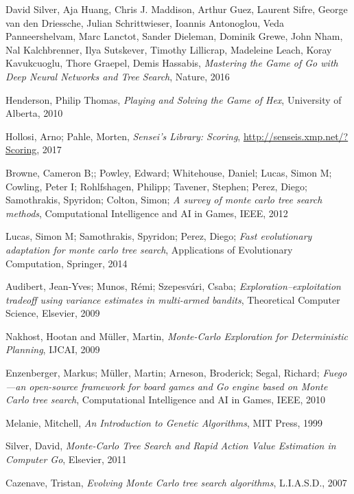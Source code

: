 \documentclass[12pt]{report}
\begin{document}
\begin{thebibliography}{99}
 David Silver, Aja Huang, Chris J. Maddison, Arthur Guez, Laurent Sifre, George van den Driessche, Julian Schrittwieser, Ioannis Antonoglou, Veda Panneershelvam, Marc Lanctot, Sander Dieleman, Dominik Grewe, John Nham, Nal Kalchbrenner, Ilya Sutskever, Timothy Lillicrap, Madeleine Leach, Koray Kavukcuoglu, Thore Graepel, Demis Hassabis, \emph{Mastering the Game of Go with Deep Neural Networks and Tree Search}, Nature, 2016

 Henderson, Philip Thomas, \emph{Playing and Solving the Game of Hex}, University of Alberta, 2010

 Hollosi, Arno; Pahle, Morten, \emph{Sensei's Library: Scoring}, \url{http://senseis.xmp.net/?Scoring}, 2017

 Browne, Cameron B;; Powley, Edward; Whitehouse, Daniel; Lucas, Simon M; Cowling, Peter I; Rohlfshagen, Philipp; Tavener, Stephen; Perez, Diego; Samothrakis, Spyridon; Colton, Simon; \emph{A survey of monte carlo tree search methods}, Computational Intelligence and AI in Games, IEEE, 2012

 Lucas, Simon M; Samothrakis, Spyridon; Perez, Diego; \emph{Fast evolutionary adaptation for monte carlo tree search}, Applications of Evolutionary Computation, Springer, 2014

 Audibert, Jean-Yves; Munos, R{\'e}mi; Szepesv{\'a}ri, Csaba; \emph{Exploration--exploitation tradeoff using variance estimates in multi-armed bandits}, Theoretical Computer Science, Elsevier, 2009

 Nakhost, Hootan and M{\"u}ller, Martin, \emph{Monte-Carlo Exploration for Deterministic Planning}, IJCAI, 2009

 Enzenberger, Markus; M{\"u}ller, Martin; Arneson, Broderick; Segal, Richard; \emph{Fuego—an open-source framework for board games and Go engine based on Monte Carlo tree search}, Computational Intelligence and AI in Games, IEEE, 2010

 Melanie, Mitchell, \emph{An Introduction to Genetic Algorithms},  MIT Press, 1999

 Silver, David, \emph{Monte-Carlo Tree Search and Rapid Action Value
Estimation in Computer Go}, Elsevier, 2011

 Cazenave, Tristan, \emph{Evolving Monte Carlo tree search algorithms}, L.I.A.S.D., 2007


\end{thebibliography}
\end{document}
